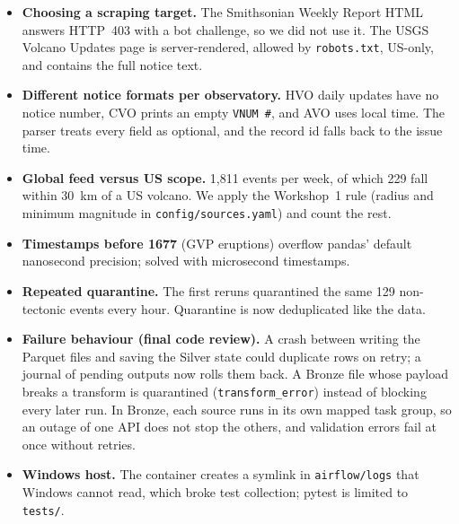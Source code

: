 \documentclass[11pt,a4paper]{article}
\begin{document}
\begin{itemize}
  \item \textbf{Choosing a scraping target.} The Smithsonian Weekly Report HTML answers HTTP~403 with a bot challenge, so we did not use it. The USGS Volcano Updates page is server-rendered, allowed by \texttt{robots.txt}, US-only, and contains the full notice text.
  \item \textbf{Different notice formats per observatory.} HVO daily updates have no notice number, CVO prints an empty \texttt{VNUM \#}, and AVO uses local time. The parser treats every field as optional, and the record id falls back to the issue time.
  \item \textbf{Global feed versus US scope.} 1,811 events per week, of which 229 fall within 30~km of a US volcano. We apply the Workshop~1 rule (radius and minimum magnitude in \texttt{config/sources.yaml}) and count the rest.
  \item \textbf{Timestamps before 1677} (GVP eruptions) overflow pandas' default nanosecond precision; solved with microsecond timestamps.
  \item \textbf{Repeated quarantine.} The first reruns quarantined the same 129 non-tectonic events every hour. Quarantine is now deduplicated like the data.
  \item \textbf{Failure behaviour (final code review).} A crash between writing the Parquet files and saving the Silver state could duplicate rows on retry; a journal of pending outputs now rolls them back. A Bronze file whose payload breaks a transform is quarantined (\texttt{transform\_error}) instead of blocking every later run. In Bronze, each source runs in its own mapped task group, so an outage of one API does not stop the others, and validation errors fail at once without retries.
  \item \textbf{Windows host.} The container creates a symlink in \texttt{airflow/logs} that Windows cannot read, which broke test collection; pytest is limited to \texttt{tests/}.
\end{itemize}
\end{document}

